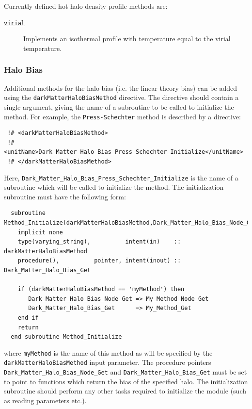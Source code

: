 Currently defined hot halo density profile methods are:
\begin{description}
 \item [\hyperlink{hot_halo.temperature_profile.virial.F90:hot_halo_temperature_profile_virial:hot_halo_temperature_virial_get}{{\tt virial}}] Implements an isothermal profile with temperature equal to the virial temperature.
\end{description}

\subsubsection{Halo Bias}

Additional methods for the halo bias (i.e. the linear theory bias) can be added using the {\tt darkMatterHaloBiasMethod} directive. The directive should contain a single argument, giving the name of a subroutine to be called to initialize the method. For example, the {\tt Press-Schechter} method is described by a directive:
\begin{verbatim}
 !# <darkMatterHaloBiasMethod>
 !#  <unitName>Dark_Matter_Halo_Bias_Press_Schechter_Initialize</unitName>
 !# </darkMatterHaloBiasMethod>
\end{verbatim}
Here, {\tt Dark\_Matter\_Halo\_Bias\_Press\_Schechter\_Initialize} is the name of a subroutine which will be called to initialize the method. The initialization subroutine must have the following form:
\begin{verbatim}
  subroutine Method_Initialize(darkMatterHaloBiasMethod,Dark_Matter_Halo_Bias_Node_Get,Dark_Matter_Halo_Bias_Get)
    implicit none
    type(varying_string),          intent(in)    :: darkMatterHaloBiasMethod
    procedure(),          pointer, intent(inout) :: Dark_Matter_Halo_Bias_Get
    
    if (darkMatterHaloBiasMethod == 'myMethod') then
       Dark_Matter_Halo_Bias_Node_Get => My_Method_Node_Get
       Dark_Matter_Halo_Bias_Get      => My_Method_Get
    end if
    return
  end subroutine Method_Initialize
\end{verbatim}
where {\tt myMethod} is the name of this method as will be specified by the {\tt darkMatterHaloBiasMethod} input parameter. The procedure pointers {\tt Dark\_Matter\_Halo\_Bias\_Node\_Get} and {\tt Dark\_Matter\_Halo\_Bias\_Get} must be set to point to functions which return the bias of the specified halo. The initialization subroutine should perform any other tasks required to initialize the module (such as reading parameters etc.).

